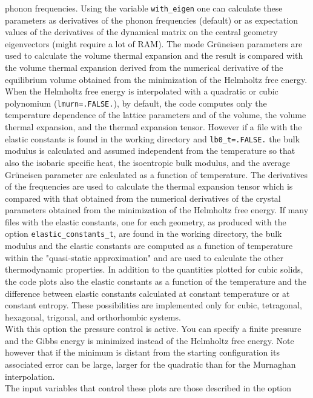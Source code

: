 \documentclass[12pt,a4paper]{article}
\begin{document}
phonon frequencies. Using the variable \texttt{with\_eigen} one can 
calculate these parameters as derivatives of the phonon frequencies 
(default) or as expectation values of the derivatives of the dynamical 
matrix on the central geometry eigenvectors (might require a lot of RAM). 
The mode Gr\"uneisen parameters are used to calculate the volume
thermal expansion and the result is compared with the volume thermal expansion
derived from the numerical derivative of the equilibrium volume obtained
from the minimization of the Helmholtz free energy. 
When the Helmholtz free energy is interpolated with a quadratic or cubic
polynomium (\texttt{lmurn=.FALSE.}), by default, the code computes only 
the temperature dependence of the lattice parameters and of the volume, the 
volume thermal expansion, and the thermal expansion tensor. However if a file 
with the elastic constants is found in the working directory 
and \texttt{lb0\_t=.FALSE.} the bulk modulus is calculated and 
assumed independent from the temperature so that also the isobaric specific 
heat, the isoentropic bulk modulus, and the average Gr\"uneisen parameter 
are calculated as a function of temperature. The derivatives of the 
frequencies are used to calculate the thermal expansion tensor which 
is compared with that obtained from the numerical derivatives of the 
crystal parameters obtained from the minimization of the Helmholtz free energy.
If many files with the elastic constants, one for each geometry, as
produced with the option \texttt{elastic\_constants\_t}, are found
in the working directory, the bulk modulus and the elastic constants
are computed as a function of temperature within the "quasi-static
approximation" and are used
to calculate the other thermodynamic properties. In addition to the
quantities plotted for cubic solids, the code plots also the elastic
constants as a function of the temperature and the difference between
elastic constants calculated at constant temperature or at constant
entropy. These possibilities are implemented only for cubic, tetragonal, 
hexagonal, trigonal, and orthorhombic systems. \\
With this option the pressure control is active. You can specify a
finite pressure and the Gibbs energy is minimized instead of the
Helmholtz free energy. Note however that if the minimum is distant from 
the starting configuration its associated error can be large, larger for the
quadratic than for the Murnaghan interpolation. \\
The input variables that control these plots are those described in the option
\end{document}

